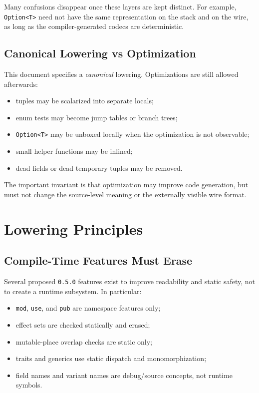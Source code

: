 \documentclass[12pt,oneside]{article}
\begin{document}
Many confusions disappear once these layers are kept distinct. For example,
\verb|Option<T>| need not have the same representation on the stack and on the
wire, as long as the compiler-generated codecs are deterministic.

\subsection{Canonical Lowering vs Optimization}
This document specifies a \emph{canonical} lowering. Optimizations are still
allowed afterwards:

\begin{itemize}
\item tuples may be scalarized into separate locals;
\item enum tests may become jump tables or branch trees;
\item \verb|Option<T>| may be unboxed locally when the optimization is not
observable;
\item small helper functions may be inlined;
\item dead fields or dead temporary tuples may be removed.
\end{itemize}

The important invariant is that optimization may improve code generation, but
must not change the source-level meaning or the externally visible wire format.

\section{Lowering Principles}
\subsection{Compile-Time Features Must Erase}
Several proposed \verb|0.5.0| features exist to improve readability and static
safety, not to create a runtime subsystem. In particular:

\begin{itemize}
\item \verb|mod|, \verb|use|, and \verb|pub| are namespace features only;
\item effect sets are checked statically and erased;
\item mutable-place overlap checks are static only;
\item traits and generics use static dispatch and monomorphization;
\item field names and variant names are debug/source concepts, not runtime
symbols.
\end{itemize}
\end{document}
